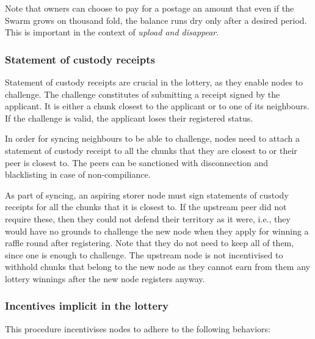Note that owners can choose to pay for a postage an amount that even if  the Swarm grows on thousand fold, the balance runs dry only after a desired period. This is important in the context of \emph{upload and disappear}.






\subsubsection{Statement of custody receipts}

Statement of custody receipts are crucial in the lottery, as they enable nodes to challenge. The challenge constitutes of submitting a receipt signed by the applicant. It is either a chunk closest to the applicant or to one of its neighbours. If the challenge is valid, the applicant loses their registered status. 

In  order for syncing neighbours to be able to challenge, nodes  need to attach a statement of custody receipt to all the chunks that they are closest to or their peer is closest to. The peers can be sanctioned with disconnection and blacklisting in case of non-compiliance. 

As part of syncing, an aspiring storer node must sign statements of custody receipts for all the chunks that it is closest to. If the upstream peer did not require these, then they could not defend their territory as it were, i.e., they would have no grounds to challenge the new node when they apply for winning a raffle round after registering. Note that they do not need to keep all of them, since one is enough to challenge. The upstream node is not incentivised to withhold chunks that belong to the new node as they cannot earn from them any lottery winnings after the new node registers anyway. 

\subsubsection{Incentives implicit in the lottery}

This procedure incentivises nodes to adhere to the following behaviors:

